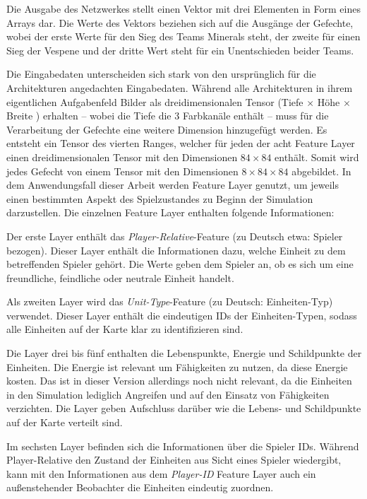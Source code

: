 Die Ausgabe des Netzwerkes stellt einen Vektor mit drei Elementen in Form eines Arrays dar. Die Werte des Vektors beziehen sich auf die Ausgänge der Gefechte, wobei der erste Werte für den Sieg des Teams Minerals steht, der zweite für einen Sieg der Vespene und der dritte Wert steht für ein Unentschieden beider Teams. 

Die Eingabedaten unterscheiden sich stark von den ursprünglich für die Architekturen angedachten Eingabedaten. Während alle Architekturen in ihrem eigentlichen Aufgabenfeld Bilder als dreidimensionalen Tensor (Tiefe $\times$ Höhe $\times$ Breite ) erhalten -- wobei die Tiefe die 3 Farbkanäle enthält -- muss für die Verarbeitung der Gefechte eine weitere Dimension hinzugefügt werden. Es entsteht ein Tensor des vierten Ranges, welcher für jeden der acht Feature Layer einen dreidimensionalen Tensor mit den Dimensionen $84 \times 84$ enthält. Somit wird jedes Gefecht von einem Tensor mit den Dimensionen $8 \times 84 \times 84$ abgebildet. In dem Anwendungsfall dieser Arbeit werden Feature Layer genutzt, um jeweils einen bestimmten Aspekt des Spielzustandes zu Beginn der Simulation darzustellen.
Die einzelnen Feature Layer enthalten folgende Informationen: 

Der erste Layer enthält das \textit{Player-Relative}-Feature (zu Deutsch etwa: Spieler bezogen). Dieser Layer enthält die Informationen dazu, welche Einheit zu dem betreffenden Spieler gehört. Die Werte geben dem Spieler an, ob es sich um eine freundliche, feindliche oder neutrale Einheit handelt. 

Als zweiten Layer wird das \textit{Unit-Type}-Feature (zu Deutsch: Einheiten-Typ) verwendet. Dieser Layer enthält die eindeutigen IDs der Einheiten-Typen, sodass alle Einheiten auf der Karte klar zu identifizieren sind.

Die Layer drei bis fünf enthalten die Lebenspunkte, Energie und Schildpunkte der Einheiten. Die Energie ist relevant um Fähigkeiten zu nutzen, da diese Energie kosten. Das ist in dieser Version allerdings noch nicht relevant, da die Einheiten in den Simulation lediglich Angreifen und auf den Einsatz von Fähigkeiten verzichten. Die Layer geben Aufschluss darüber wie die Lebens- und Schildpunkte auf der Karte verteilt sind.

Im sechsten Layer befinden sich die Informationen über die Spieler IDs. Während Player-Relative den Zustand der Einheiten aus Sicht eines Spieler wiedergibt, kann mit den Informationen aus dem \textit{Player-ID} Feature Layer auch ein außenstehender Beobachter die Einheiten eindeutig zuordnen.

